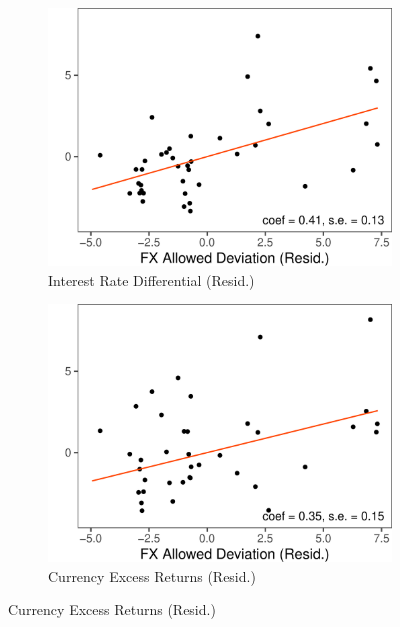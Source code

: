 \begin{figure}
  \begin{minipage}{\linewidth}
    \caption{Interest Rate Differentials, Capital Intensity, and
      Exchange Rate Regimes \label{fig_stylized}}
    \label{fig_intro}
    \begin{subfigure}{.33\textwidth}
      \centering
      \caption{Interest Rate Differential (Resid.)}
      \includegraphics[width=\textwidth]{./Figures/Figure_FP_ERA.pdf}
    \end{subfigure}
    \begin{subfigure}{.33\textwidth}
      \centering
      \caption{Currency Excess Returns (Resid.)}
      \includegraphics[width=\textwidth]{./Figures/Figure_RX_ERA.pdf}

\end{subfigure}
\end{minipage}
\end{figure}
